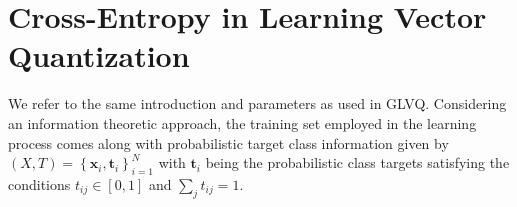 \section{Cross-Entropy in Learning Vector Quantization}
We refer to the same introduction and parameters  as used in GLVQ. Considering an information theoretic approach, the training set employed in the learning process comes along with probabilistic target class information given by \hspace{2pt}$(X,T) = \left\lbrace \mathbf{x}_i , \mathbf{t}_i\right\rbrace _{i=1}^{N}$ with\hspace{2pt} $\mathbf{t}_i$\hspace{2pt} being the probabilistic class targets satisfying the conditions\hspace{3pt}  $t_{ij}\in \left[ 0,1\right] $ \hspace{2pt}and \hspace{2pt}$\sum_{j}t_{ij} = 1$\cite{villmann2018probabilistic}.

